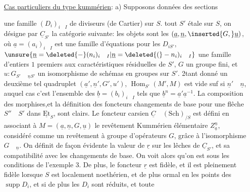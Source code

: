 \uline{Cas particuliers du type kummérien}: a) Supposons données des sections

 une famille $(D_i)_{i\quad I}$ de diviseurs (de Cartier) sur $S$.  tout $S'$ étale sur $S$, on désigne par $\underline{C}_{S'}$ la catégorie suivante: les objets sont les   $(\underline{a},\underline{n},\inserted{G,}\underline{u})$, où $\underline{a}=(a_i)_{i\quad I}$ est une famille d'équations pour les $D_{iS'}$, $\unsure{\underline{n}=\deleted{-}(n_i)_{i\quad I}|\underline{n}=\deleted{(}-n_i)_{i\quad I}}$ une famille d'entiers $1$ premiers aux caractéristiques résiduelles de $S'$,  $G$ un groupe fini, et $u:G_{S'}\quad{}_{\underline{n}S'}$ un isomorphisme de schémas en groupes sur $S'$. 2tant donné un deuxième tel quadruplet  $(\underline{a}',\underline{n}',G',u')$,  $\operatorname{Hom}_{S'}(M',M)$ est vide suf si $\underline{n}'\quad\underline{n}$, auquel cas c'est l'ensemble des $\underline{b}=(b_i)_{i\quad I}$ tels que $\underline{b}^{n}=\underline{a}'\underline{a}^{-1}$. La composition des morphises,et la définition des foncteurs changements de base pour une flêche $S''\quad S'$ dans $\underline{\mathrm{Et}}_S$, sont clairs. Le foncteur carsien $\underline{C}\quad(\mathrm{Sch})_{/S}$ est défini en associant à $M=(\underline{a},\underline{n},G,\underline{u})$ le revêtement Kummérien élémentaire $Z_{\underline{a}}^{\underline{n}}$,   considéré comme un revêtement à groupe d'opérateurs $G$, grâce à l'isomorphisme $G\quad{}_{\underline{n}}$. On définit de façon évidente la valeur de $\underline{r}$ sur les lêches de $\underline{C}_{S'}$, et sa compatibilité avec les changements de base. On voit alors qu'on est sous les conditions de l'exemple 3. De plus, le foncteur $\underline{r}$ est fidèle, et il est pleinement fidèle lorsque $S$ est  localement noethérien, et de plus ormal en les points des $\operatorname{supp}D_i$, et si de plus les $D_i$ sont réduits, et toute 

